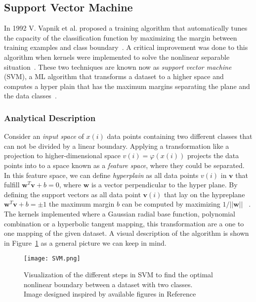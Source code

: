 \subsection{Support Vector Machine}




In 1992 V. Vapnik et al. proposed a training algorithm that automatically tunes the capacity of the classification function by maximizing the margin between training examples and class boundary~\cite{boser1992training}. A critical improvement was done to this algorithm when kernels were implemented to solve the nonlinear separable situation~\cite{smola1998learning}. These two techniques are known now as \textit{support vector machine} (SVM), a ML algorithm that transforms a dataset to a higher space and computes a hyper plain that has the maximum margins separating the plane and the data classes~\cite{marsland2014machine}.~\\

\subsubsection{Analytical Description}

 Consider an \textit{input space} of $x(i)$ data points containing two different classes that can not be divided by a linear boundary. Applying a transformation like a projection to higher-dimensional space $v(i)=\varphi(x(i))$ projects the data points into to a space known as a \textit{feature space}, where they could be separated. In this feature space, we can define \textit{hyperplain} as all data points $v(i)$ in $\textbf{v}$ that fulfill $\textbf{w}^{T}\textbf{v}+b=0$, where $\textbf{w}$ is a vector perpendicular to the hyper plane. By defining the support vectors  as all data point $\textbf{v}(i)$ that lay on the hypreplane  $\textbf{w}^{T}\textbf{v}+b=\pm 1$ the maximum margin $b$ can be computed by maximizing $1/||\textbf{w}||$ ~\cite{marsland2014machine,Nonparameter,khan2019optical}. The kernels implemented where a Gaussian radial base function, polynomial combination or a hyperbolic tangent mapping, this transformation are a one to one mapping of the given dataset. A visual description of the algorithm is shown in Figure~\ref{fig:SVMshow} as a general picture we can keep in mind.~\\  
\begin{figure}[h]
\centering
\texttt{[image: SVM.png]}
\caption{Visualization of the different steps in SVM to find the optimal nonlinear boundary between a dataset with two classes.\\ {\scriptsize Image designed inspired by available figures in Reference~\cite{khan2019optical}}}
\label{fig:SVMshow}
\end{figure}

